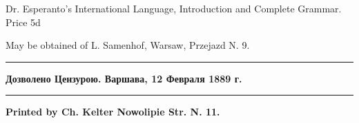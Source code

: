 \begin{landscape}
\begin{multicols}{5}
\end{multicols}

\begin{center}
{\leftpointright \hspace{1em} Dr. Esperanto's International Language, Introduction and Complete Grammar. Price 5d\hspace{1em}\rightpointleft}

{\small May be obtained of L. Samenhof, Warsaw, Przejazd N. 9.}

\begin{minipage}[t]{7cm}
\rule{7cm}{0.4pt}
\bf\scriptsize Дозволено Цензурою. Варшава, 12 Февраля 1889 г. 
\end{minipage}
\begin{minipage}[t]{4cm}
\hspace{4cm}
\end{minipage}
\begin{minipage}[t]{7cm}
\begin{flushright}
\rule{7cm}{0.4pt}
\bf\scriptsize Printed by Ch. Kelter Nowolipie Str. N. 11.
\end{flushright}
\end{minipage}
\end{center}
\end{landscape}
\restoregeometry

\setlength{\parindent}{\savedparindent}